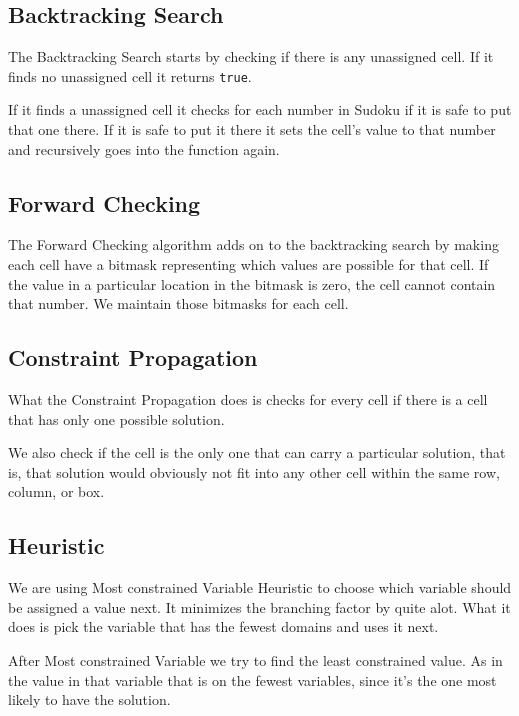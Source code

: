 \documentclass[12pt,a4paper]{article}
\begin{document}

\subsection*{Backtracking Search}

The Backtracking Search starts by checking if there is any unassigned cell. If it 
finds no unassigned cell it returns \verb+true+.

If it finds a unassigned cell it checks for each number in Sudoku if it is safe 
to put that one there. If it is safe to put it there it sets the cell's value to that 
number and recursively goes into the function again.

\subsection*{Forward Checking}

The Forward Checking algorithm adds on to the backtracking search by making each 
cell have a bitmask representing which values are possible for that cell. If 
the value in a particular location in the bitmask is zero, the cell cannot
contain that number. We maintain those bitmasks for each cell.

\subsection*{Constraint Propagation}

What the Constraint Propagation does is checks for every cell if there is a cell
that has only one possible solution.

We also check if the cell is the only one that can carry a particular solution,
that is, that solution would obviously not fit into any other cell within the
same row, column, or box.

\subsection*{Heuristic}

We are using Most constrained Variable Heuristic to choose which variable should
be assigned a value next. It minimizes the branching factor by quite alot.
What it does is pick the variable that has the fewest domains and uses it next.

After Most constrained Variable we try to find the least constrained value. As in 
the value in that variable that is on the fewest variables, since it's the one most
likely to have the solution.
\end{document}
